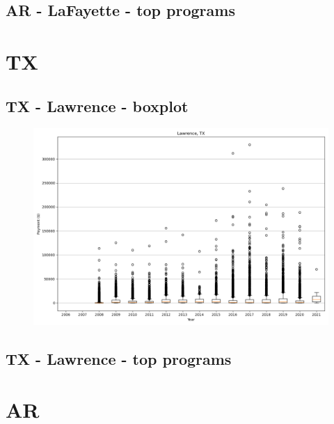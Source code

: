 \subsection*{AR - LaFayette - top programs}

\newpage
\section*{TX}
\subsection*{TX - Lawrence - boxplot}
\begin{figure}[h]
\centering
\includegraphics[width=7in]{../output/boxplots/counties/Lawrence-TX_boxplot.png}
\end{figure}


\subsection*{TX - Lawrence - top programs}

\newpage
\section*{AR}
